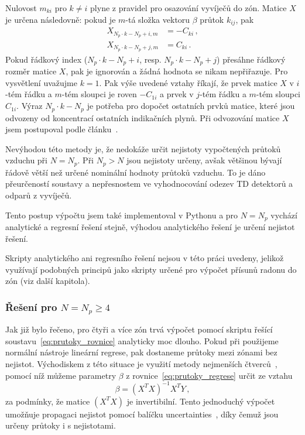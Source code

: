 Nulovost $m_{ki}$ pro $k\neq i$ plyne z pravidel pro osazování vyvíječů do zón. Matice $X$ je určena následovně: pokud je $m$-tá složka vektoru $\beta$ průtok $k_{ij}$, pak 
\begin{align}
    X_{N_p\cdot k-N_p+i,m}&=-C_{ki}\,,\\
    X_{N_p\cdot k-N_p+j,m}&=C_{ki}\,.
\end{align}
Pokud řádkový index ($N_p\cdot k-N_p+i$, resp. $N_p\cdot k-N_p+j$) přesáhne řádkový rozměr matice $X$, pak je ignorován a žádná hodnota se nikam nepřiřazuje. Pro vysvětlení uvažujme $k=1$. Pak výše uvedené vztahy říkají, že prvek matice $X$ v $i$-tém řádku a $m$-tém sloupci je roven $-C_{1i}$ a prvek v $j$-tém řádku a $m$-tém sloupci $C_{1i}$. Výraz $N_p\cdot k-N_p$ je potřeba pro dopočet ostatních prvků matice, které jsou odvozeny od koncentrací ostatních indikačních plynů. Při odvozování matice $X$ jsem postupoval podle článku~\cite{japonci2}.

Nevýhodou této metody je, že nedokáže určit nejistoty vypočtených průtoků vzduchu při $N=N_{p}$. Při $N_p>N$ jsou nejistoty určeny, avšak většinou bývají řádově větší než určené nominální hodnoty průtoků vzduchu. To je dáno přeurčeností soustavy a nepřesnostem ve vyhodnocování odezev TD detektorů a odparů z vyvíječů.

Tento postup výpočtu jsem také implementoval v Pythonu a pro $N=N_{p}$ vychází analytické a regresní řešení stejně, výhodou analytického řešení je určení nejistot řešení. 

Skripty analytického ani regresního řešení nejsou v této práci uvedeny, jelikož využívají podobných principů jako skripty určené pro výpočet přísunů radonu do zón (viz další kapitola).

\subsubsection{Řešení pro $N=N_p\geq 4$}
Jak již bylo řečeno, pro čtyři a více zón trvá výpočet pomocí skriptu řešící soustavu~\eqref{eq:prutoky_rovnice} analyticky moc dlouho. Pokud při  použijeme normální nástroje lineární regrese, pak dostaneme průtoky mezi zónami bez nejistot. Východiskem z této situace je využití metody nejmenších čtverců~\cite{wiki_OLS}, pomocí níž můžeme parametry $\beta$ z rovnice~\eqref{eq:prutoky_regrese} určit ze vztahu
\begin{equation}
    \beta=(X^T X)^{-1}X^T Y\,,
    \label{eq:prutoky_OLS}
\end{equation}
za podmínky, že matice $(X^T X)$ je invertibilní. Tento jednoduchý výpočet umožňuje propagaci nejistot pomocí balíčku uncertainties~\cite{uncertainties}, díky čemuž jsou určeny průtoky i s nejistotami. 

